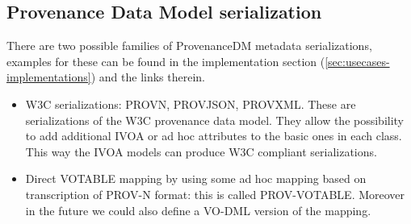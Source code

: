 \subsection{Provenance Data Model serialization}\label{sec:serialisations}
There are two possible families of ProvenanceDM metadata serializations, examples for these can be found in the implementation section (\ref{sec:usecases-implementations}) and the links therein.
\begin{itemize}
 \item W3C serializations: PROV\-N, PROV\-JSON, PROV\-XML. These are serializations of the W3C provenance data model. They allow the possibility to add additional IVOA or ad hoc attributes to the basic ones in each class. This way the IVOA models can produce W3C compliant serializations.


 \item Direct VOTABLE mapping by using some ad hoc mapping based on transcription of PROV-N format: this is called PROV-VOTABLE. Moreover in the future we could also define a VO-DML \citep{std:VODML} version of the mapping.

\end{itemize}

